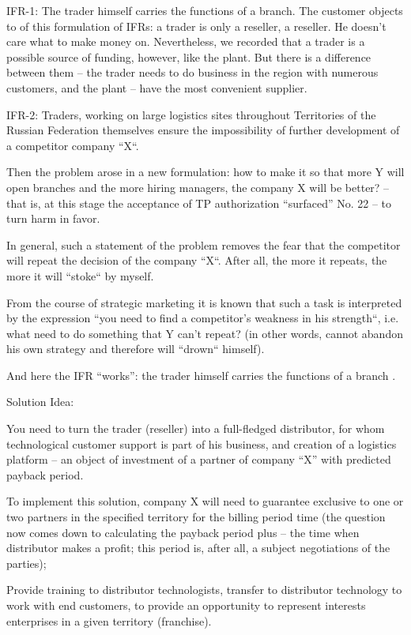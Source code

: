\documentclass[11pt,a4paper]{book}
\begin{document}
IFR-1: The trader himself carries the functions of a branch. The customer
objects to of this formulation of IFRs: a trader is only a reseller, a
reseller. He doesn't care what to make money on. Nevertheless, we recorded
that a trader is a possible source of funding, however, like the plant. But
there is a difference between them -- the trader needs to do business in the
region with numerous customers, and the plant -- have the most convenient
supplier.

IFR-2: Traders, working on large logistics sites throughout Territories of the
Russian Federation themselves ensure the impossibility of further development
of a competitor company “X“.

Then the problem arose in a new formulation: how to make it so that more Y
will open branches and the more hiring managers, the company X will be better?
-- that is, at this stage the acceptance of TP authorization “surfaced” No. 22
-- to turn harm in favor.

In general, such a statement of the problem removes the fear that the
competitor will repeat the decision of the company “X“. After all, the more it
repeats, the more it will “stoke“ by myself.

From the course of strategic marketing it is known that such a task is
interpreted by the expression “you need to find a competitor’s weakness in his
strength“, i.e. what need to do something that Y can't repeat? (in other
words, cannot abandon his own strategy and therefore will “drown“ himself).

And here the IFR “works”: the trader himself carries the functions of a branch .

Solution Idea:

You need to turn the trader (reseller) into a full-fledged distributor, for
whom technological customer support is part of his business, and creation of a
logistics platform -- an object of investment of a partner of company “X” with
predicted payback period.

To implement this solution, company X will need to guarantee exclusive to one
or two partners in the specified territory for the billing period time (the
question now comes down to calculating the payback period plus -- the time
when distributor makes a profit; this period is, after all, a subject
negotiations of the parties);

Provide training to distributor technologists, transfer to distributor
technology to work with end customers, to provide an opportunity to represent
interests enterprises in a given territory (franchise).
\end{document}
